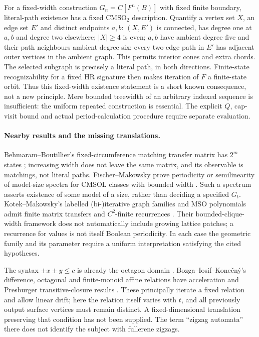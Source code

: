 \documentclass[11pt]{amsart}
\theoremstyle{definition}\newtheorem{definition}{Definition}
\begin{document}
For a fixed-width construction $G_n=C[F^n(B)]$ with fixed finite
boundary, literal-path existence has a fixed CMSO$_2$ description.
Quantify a vertex set $X$, an edge set $E'$ and distinct endpoints
$a,b$: $(X,E')$ is connected, has degree one at $a,b$ and degree two
elsewhere; $|X|\ge4$ is even; $a,b$ have ambient degree five and their
path neighbours ambient degree six; every two-edge path in $E'$ has
adjacent outer vertices in the ambient graph. This permits interior
cones and extra chords. The selected subgraph is precisely a literal
path, in both directions. Finite-state recognizability for a fixed
HR signature \cite[Chapter 1, Theorems 1.12 and 1.21(2)]{Courcelle}
then makes iteration of $F$ a finite-state orbit. Thus this fixed-width
existence statement is a short known consequence, not a new principle.
Mere bounded treewidth of an arbitrary indexed sequence is insufficient:
the uniform repeated construction is essential. The explicit $Q$,
cap-visit bound and actual period-calculation procedure require
separate evaluation.

\paragraph{Nearby results and the missing translations.}
Behmaram--Boutillier's fixed-circumference matching transfer matrix
has $2^m$ states \cite[Section 3, Eq.\ (3.1)]{Behmaram}; increasing
width does not leave the same matrix, and its observable is matchings,
not literal paths. Fischer--Makowsky prove periodicity or semilinearity
of model-size spectra for CMSOL classes with bounded width
\cite[Theorems 1.4, 1.7 and 1.10]{Fischer}. Such a spectrum asserts
existence of some model of a size, rather than deciding a specified
$G_t$. Kotek--Makowsky's labelled (bi-)iterative graph families and MSO
polynomials admit finite matrix transfers and $C^2$-finite recurrences
\cite[Definitions 17--20, Lemma 28, Theorems 30 and 32]{Kotek}.
Their bounded-clique-width framework does not automatically include
growing lattice patches; a recurrence for values is not itself
Boolean periodicity. In each case the geometric family and its
parameter require a uniform interpretation satisfying the cited
hypotheses.

The syntax $\pm x\pm y\le c$ is already the octagon domain
\cite[p.~1]{Mine}. Bozga--Iosif--Kone\v{c}n\'y's difference,
octagonal and finite-monoid affine relations have acceleration and
Presburger transitive-closure results
\cite[Definition 1 and Sections 4.2.1--4.2.2]{Bozga}. These principally
iterate a fixed relation and allow linear drift; here the relation
itself varies with $t$, and all previously output surface vertices
must remain distinct. A fixed-dimensional translation preserving that
condition has not been supplied. The term ``zigzag automata'' there
does not identify the subject with fullerene zigzags.
\end{document}
